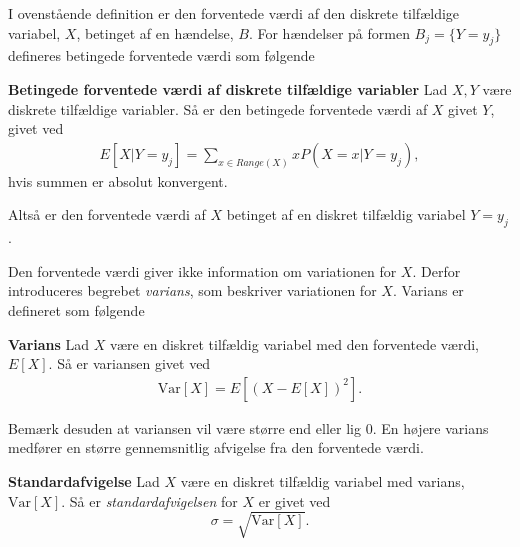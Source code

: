 I ovenstående definition er den forventede værdi af den diskrete tilfældige variabel, $X$, betinget af en hændelse, $B$. For hændelser på formen $B_j = \{Y=y_j\}$ defineres betingede forventede værdi som følgende 

\begin{minipage}\textwidth
\begin{defn}\textbf{Betingede forventede værdi af diskrete tilfældige variabler}\label{def:betinget_forventet_værdi_af_diskrete_tilfældige_variabler} %
\newline
Lad $X, Y$ være diskrete tilfældige variabler. Så er den betingede forventede værdi af $X$ givet $Y$, givet ved
\begin{align*}
    E[X|Y=y_j] = \sum_{x\in Range(X)}xP(X=x|Y=y_j),
\end{align*}
hvis summen er absolut konvergent.
\end{defn}
\end{minipage}

Altså er den forventede værdi af $X$ betinget af en diskret tilfældig variabel $Y=y_j$.

Den forventede værdi giver ikke information om variationen for $X$. Derfor introduceres begrebet \textit{varians}, som beskriver variationen for $X$. Varians er defineret som følgende

\begin{minipage}\textwidth
\begin{defn}\textbf{Varians}\label{def:varians} %
\newline
Lad $X$ være en diskret tilfældig variabel med den forventede værdi, $E[X]$. Så er variansen givet ved
\begin{align*}
    \text{Var}[X]=E\left[\left(X-E[X]\right)^2\right].
\end{align*}
\end{defn}
\end{minipage}



Bemærk desuden at variansen vil være større end eller lig $0$. En højere varians medfører en større gennemsnitlig afvigelse fra den forventede værdi. 

\begin{minipage}\textwidth
\begin{defn}\textbf{Standardafvigelse} %
\newline
Lad $X$ være en diskret tilfældig variabel med varians, $\text{Var}[X]$. Så er \textit{standardafvigelsen} for $X$ er givet ved 
$$\sigma = \sqrt{\text{Var}[X]}.$$
\end{defn}
\end{minipage}


